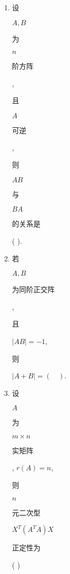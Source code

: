 \documentclass[10pt]{article}
\begin{document}
\begin{enumerate}
  \item \begin{CJK}{UTF8}{mj}设\end{CJK} $A, B$ \begin{CJK}{UTF8}{mj}为\end{CJK} $n$ \begin{CJK}{UTF8}{mj}阶方阵\end{CJK}, \begin{CJK}{UTF8}{mj}且\end{CJK} $A$ \begin{CJK}{UTF8}{mj}可逆\end{CJK}, \begin{CJK}{UTF8}{mj}则\end{CJK} $A B$ \begin{CJK}{UTF8}{mj}与\end{CJK} $B A$ \begin{CJK}{UTF8}{mj}的关系是\end{CJK} ( ).

  \item \begin{CJK}{UTF8}{mj}若\end{CJK} $A, B$ \begin{CJK}{UTF8}{mj}为同阶正交阵\end{CJK}, \begin{CJK}{UTF8}{mj}且\end{CJK} $|A B|=-1$, \begin{CJK}{UTF8}{mj}则\end{CJK} $|A+B|=(\quad)$.

  \item \begin{CJK}{UTF8}{mj}设\end{CJK} $A$ \begin{CJK}{UTF8}{mj}为\end{CJK} $m \times n$ \begin{CJK}{UTF8}{mj}实矩阵\end{CJK}, $r(A)=n$, \begin{CJK}{UTF8}{mj}则\end{CJK} $n$ \begin{CJK}{UTF8}{mj}元二次型\end{CJK} $X^{T}\left(A^{T} A\right) X$ \begin{CJK}{UTF8}{mj}正定性为\end{CJK} ( )

\end{enumerate}
\end{document}
